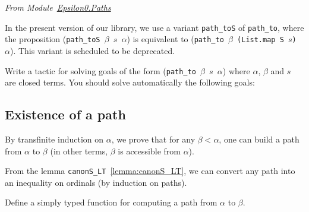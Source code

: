 \vspace{4pt}
\emph{From Module~\href{../theories/html/hydras.Epsilon0.Paths.html}{Epsilon0.Paths}}

\label{sect:path-to-def}





\begin{remark}
In the present version of our library, we use a variant \texttt{path\_toS} of
\texttt{path\_to}, where the proposition
(\texttt{path\_toS $\beta$ $s$ $\alpha$}) is equivalent to
(\texttt{path\_to $\beta$ (List.map S $s$) $\alpha$}). This variant is scheduled to be deprecated.
\end{remark}


\begin{exercise}
Write a tactic for solving goals of the form (\texttt{path\_to $\beta$ $s$ $\alpha$})
where $\alpha$, $\beta$ and $s$ are closed terms. 
You should solve automatically the following goals:

\end{exercise}



\subsection{Existence of a path}


By transfinite induction on $\alpha$, we prove that for any $\beta<\alpha$, 
one can build a path from $\alpha$ to $\beta$ (in other terms, $\beta$ is accessible from $\alpha$).





\noindent 
From the lemma \texttt{canonS\_LT}~\vref{lemma:canonS_LT}, we can convert any path into an inequality on ordinals (by induction on paths).




\begin{exercise}
Define a simply typed function for computing a path from $\alpha$ to $\beta$.
\end{exercise}

